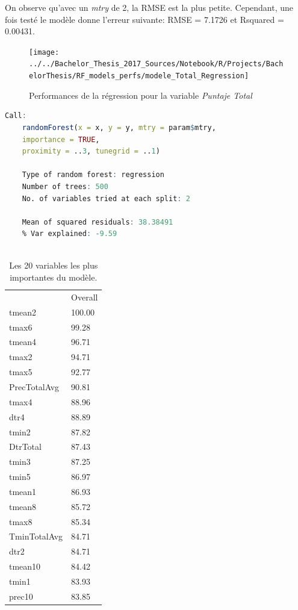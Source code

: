 \noindent On observe qu'avec un \textit{mtry} de 2, la RMSE est la plus petite. Cependant, une fois testé le modèle donne l'erreur suivante: RMSE = 7.1726 et Rsquared = 0.00431. 


\begin{figure}[H]
	\centering
	\texttt{[image: ../../Bachelor\_Thesis\_2017\_Sources/Notebook/R/Projects/BachelorThesis/RF\_models\_perfs/modele\_Total\_Regression]}
	\caption{Performances de la régression pour la variable \textit{Puntaje Total}}
	\label{fig:modeletotalregression}
\end{figure}

\begin{minipage}{\linewidth}
	
	\begin{lstlisting}[showstringspaces=false,language=R, caption={Test du modèle de classification},captionpos=b]
	Call:
	randomForest(x = x, y = y, mtry = param$mtry, 
	importance = TRUE,
	proximity = ..3, tunegrid = ..1) 
	
	Type of random forest: regression
	Number of trees: 500
	No. of variables tried at each split: 2
	
	Mean of squared residuals: 38.38491
	% Var explained: -9.59
	
	\end{lstlisting}
\end{minipage}


\begin{table}[H]
	\centering
	\caption{Les 20 variables les plus importantes du modèle.}
	\label{RF_Total_Varimp}
	\begin{tabular}{ll}
		& Overall \\
		tmean2       & 100.00  \\
		tmax6        & 99.28   \\
		tmean4       & 96.71   \\
		tmax2        & 94.71   \\
		tmax5        & 92.77   \\
		PrecTotalAvg & 90.81   \\
		tmax4        & 88.96   \\
		dtr4         & 88.89   \\
		tmin2        & 87.82   \\
		DtrTotal     & 87.43   \\
		tmin3        & 87.25   \\
		tmin5        & 86.97   \\
		tmean1       & 86.93   \\
		tmean8       & 85.72   \\
		tmax8        & 85.34   \\
		TminTotalAvg & 84.71   \\
		dtr2         & 84.71   \\
		tmean10      & 84.42   \\
		tmin1        & 83.93   \\
		prec10       & 83.85  
	\end{tabular}
\end{table}



